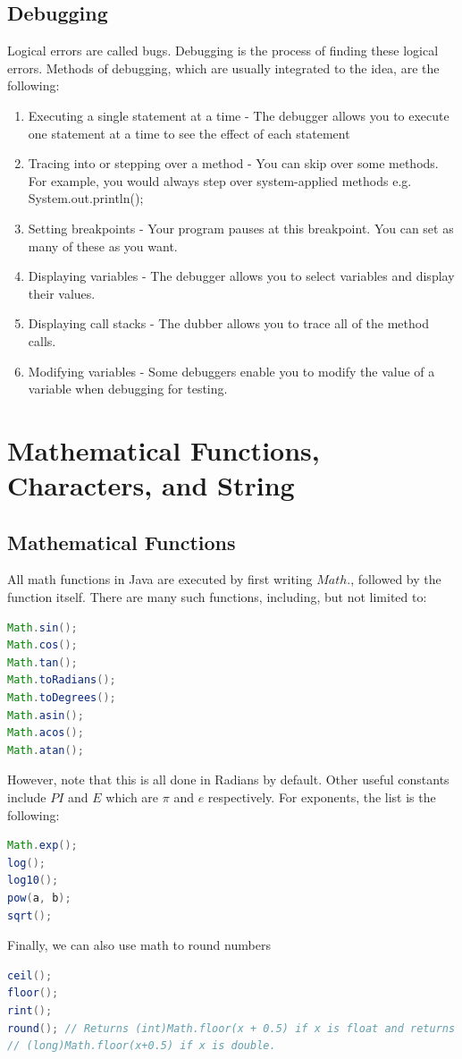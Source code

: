\documentclass[11pt,a4 paper]{book}
\theoremstyle{plain}
\theoremstyle{definition}
\theoremstyle{remark}
\begin{document}
\begin{flushleft}
\subsection{Debugging}
Logical errors are called bugs. Debugging is the process of finding these logical errors. Methods of debugging, which are usually integrated to the idea, are the following:
\begin{enumerate}
	\item Executing a single statement at a time - The debugger allows you to execute one statement at a time to see the effect of each statement
	\item Tracing into or stepping over a method - You can skip over some methods. For example, you would always step over system-applied methods e.g. System.out.println();
	\item Setting breakpoints - Your program pauses at this breakpoint. You can set as many of these as you want.
	\item Displaying variables - The debugger allows you to select variables and display their values.
	\item Displaying call stacks - The dubber allows you to trace all of the method calls. 
	\item Modifying variables - Some debuggers enable you to modify the value of a variable when debugging for testing.
\end{enumerate}
\section{Mathematical Functions, Characters, and String}
\subsection{Mathematical Functions}
All math functions in Java are executed by first writing $Math.$, followed by the function itself. There are many such functions, including, but not limited to:
\begin{lstlisting}[language = Java]
Math.sin();
Math.cos();
Math.tan();
Math.toRadians();
Math.toDegrees();
Math.asin();
Math.acos();
Math.atan();
\end{lstlisting}
However, note that this is all done in Radians by default. Other useful constants include $PI$ and $E$ which are $\pi$ and $e$ respectively. For exponents, the list is the following:
\begin{lstlisting}[language = Java]
Math.exp();
log();
log10();
pow(a, b);
sqrt();
\end{lstlisting}
Finally, we can also use math to round numbers
\begin{lstlisting}[language = Java]
ceil();
floor();
rint();
round(); // Returns (int)Math.floor(x + 0.5) if x is float and returns
// (long)Math.floor(x+0.5) if x is double. 
\end{lstlisting}

\end{flushleft}
\end{document}

